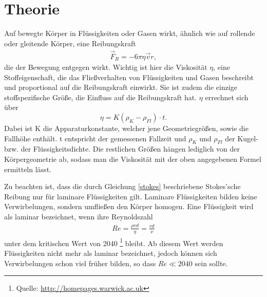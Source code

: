 \newpage					%




	\section{Theorie}
Auf bewegte Körper in Flüssigkeiten oder Gasen wirkt, ähnlich wie auf rollende oder gleitende Körper, eine Reibungskraft
\begin{align}
\vec F_R=-6 \pi \eta \vec{v} r,
\label{stokes}
\end{align}
 die der Bewegung entgegen wirkt. Wichtig ist hier die Viskosität $\eta $, eine Stoffeigenschaft, die das Fließverhalten von Flüssigkeiten und Gasen beschreibt und proportional auf die Reibungskraft einwirkt. Sie ist zudem die einzige stoffspezifische Größe, die Einfluss auf die Reibungskraft hat. 
$\eta$ errechnet sich über
\begin{equation}
  \eta = K(\rho_K - \rho_{Fl})\cdot t.
  \label{viskos}
 \end{equation}
Dabei ist K die Apparaturkonstante, welcher jene Geometriegrößen, sowie die Fallhöhe enthält. t entspricht der gemessenen Fallzeit und $\rho_K$ und $\rho_{Fl}$ der Kugel- bzw. der Flüssigkeitsdichte.
Die restlichen Größen hängen lediglich von der Körpergeometrie ab, sodass man die Viskosität mit der oben angegebenen Formel ermitteln lässt. 

 Zu beachten ist, dass die durch Gleichung \eqref{stokes} beschriebene Stokes'sche Reibung nur für laminare Flüssigkeiten gilt. Laminare Flüssigkeiten bilden keine Verwirbelungen, sondern umfließen den Körper homogen. Eine Flüssigkeit wird als laminar bezeichnet, wenn ihre Reynoldszahl
 \begin{align}
 Re= \frac{\rho v d}{\eta} = \frac{v d}{\nu}
 \label{rey}
 \end{align}
unter dem kritischen Wert von 2040 \footnote{Quelle: \href{http://homepages.warwick.ac.uk/~masax/Research/critical_point_pipe_flow/critical_point_pipe_flow.html}{http://homepages.warwick.ac.uk} } bleibt. Ab diesem Wert werden Flüssigkeiten nicht mehr als laminar bezeichnet, jedoch können sich Verwirbelungen schon viel früher bilden, so dass  $Re \ll 2040$ sein sollte. 

